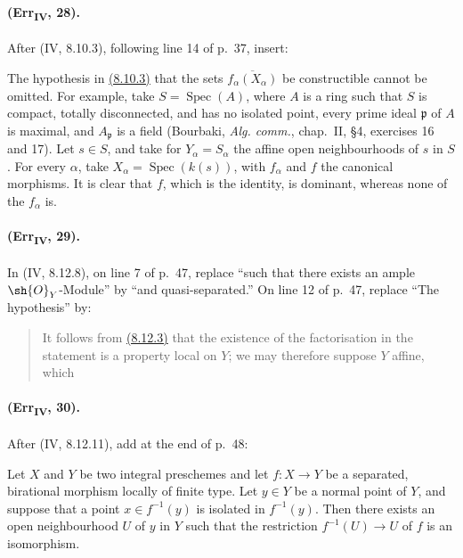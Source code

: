 \paragraph{(Err\textsubscript{IV}, 28).}
After (IV, 8.10.3), following line 14 of p.~37, insert:

\begin{remark}[8.10.3.1]
\label{IV.8.10.3.1}
The hypothesis in {\hyperlink{ega4.c04.prop.8-10-3}{(8.10.3)}} that the sets
$\overline{f_\alpha(X_\alpha)}$ be constructible cannot be omitted.
For example, take $S=\operatorname{Spec}(A)$, where $A$ is a ring such
that $S$ is compact, totally disconnected, and has no isolated point,
every prime ideal $\mathfrak p$ of $A$ is maximal, and $A_\mathfrak p$
is a field (Bourbaki, \emph{Alg. comm.}, chap.~II, \S4,
exercises 16 and 17).  Let $s\in S$, and take for
$Y_\alpha=S_\alpha$ the affine open neighbourhoods of $s$ in $S$.
For every $\alpha$, take $X_\alpha=\operatorname{Spec}(k(s))$, with
$f_\alpha$ and $f$ the canonical morphisms.  It is clear that $f$,
which is the identity, is dominant, whereas none of the $f_\alpha$ is.
\end{remark}

\paragraph{(Err\textsubscript{IV}, 29).}
In (IV, 8.12.8), on line 7 of p.~47, replace ``such that there exists an
ample $\sh{O}_Y$-Module'' by ``and quasi-separated.''  On line 12 of
p.~47, replace ``The hypothesis'' by:
\begin{quote}
It follows from {\hyperlink{ega4.c04.prop.8-12-3}{(8.12.3)}} that the existence of the factorisation in the
statement is a property local on $Y$; we may therefore suppose $Y$
affine, which
\end{quote}

\paragraph{(Err\textsubscript{IV}, 30).}
After (IV, 8.12.11), add at the end of p.~48:

\begin{corollary}[8.12.12]
\label{IV.8.12.12}
Let $X$ and $Y$ be two integral preschemes and let $f:X\to Y$ be a
separated, birational morphism locally of finite type.  Let $y\in Y$ be
a normal point of $Y$, and suppose that a point $x\in f^{-1}(y)$ is
isolated in $f^{-1}(y)$.  Then there exists an open neighbourhood $U$
of $y$ in $Y$ such that the restriction $f^{-1}(U)\to U$ of $f$ is an
isomorphism.
\end{corollary}

